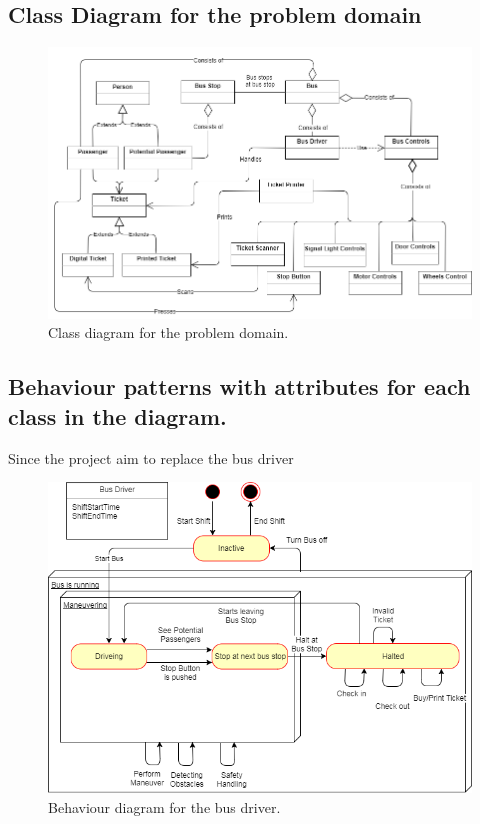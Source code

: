 \subsection{Class Diagram for the problem domain}



\begin{figure}[H]
\centering
\includegraphics[scale=0.49]{Images/problem_domain_class_diagram.png}
\caption{Class diagram for the problem domain.}
\label{problem-domain-class-diagram}
\end{figure}


\subsection{Behaviour patterns with attributes for each class in the diagram.}

Since the project aim to replace the bus driver

\begin{figure}[H]
\centering
\includegraphics[scale=0.6]{Images/BehaviorDiagramBusDriver.png}
\caption{Behaviour diagram for the bus driver.}
\label{BehaviorDiagramBusDriver}
\end{figure}